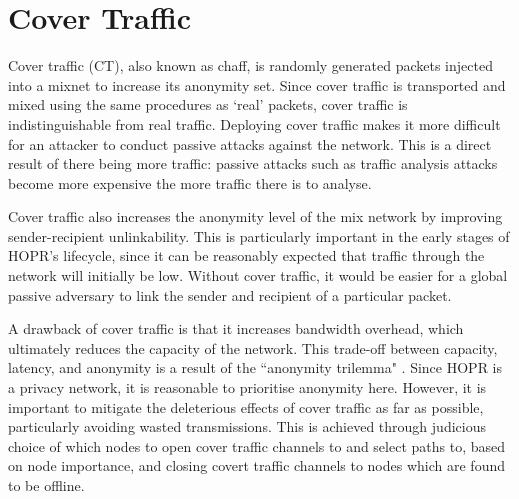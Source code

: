 \section{Cover Traffic}
\label{sec:ct}

Cover traffic (CT), also known as chaff, is randomly generated packets injected into a mixnet to increase its anonymity set. Since cover traffic is transported and mixed using the same procedures as `real' packets, cover traffic is indistinguishable from real traffic. Deploying cover traffic makes it more difficult for an attacker to conduct passive attacks against the network. This is a direct result of there being more traffic: passive attacks such as traffic analysis attacks become more expensive the more traffic there is to analyse.

Cover traffic also increases the anonymity level of the mix network by improving sender-recipient unlinkability. This is particularly important in the early stages of HOPR's lifecycle, since it can be reasonably expected that traffic through the network will initially be low. Without cover traffic, it would be easier for a global passive adversary to link the sender and recipient of a particular packet.

A drawback of cover traffic is that it increases bandwidth overhead, which ultimately reduces the capacity of the network. This trade-off between capacity, latency, and anonymity is a result of the ``anonymity trilemma" \cite{AnonymityTrilemma}. Since HOPR is a privacy network, it is reasonable to prioritise anonymity here. However, it is important to mitigate the deleterious effects of cover traffic as far as possible, particularly avoiding wasted transmissions. This is achieved through judicious choice of which nodes to open cover traffic channels to and select paths to, based on node importance, and closing covert traffic channels to nodes which are found to be offline. 




